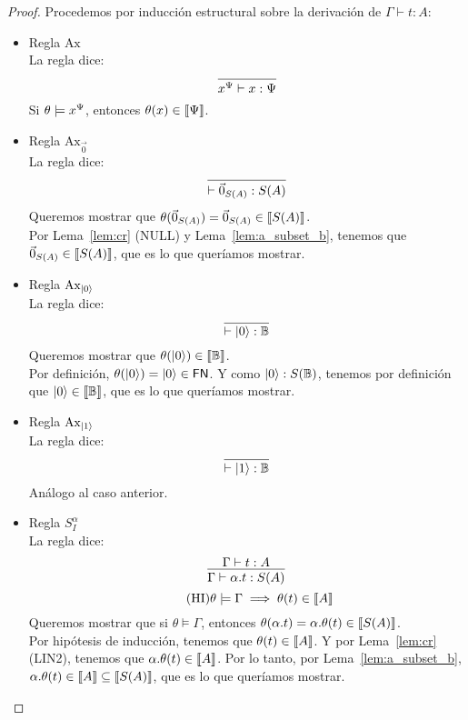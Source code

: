 \begin{proof}
  Procedemos por inducción estructural sobre la derivación de \( \Gamma \vdash t : A \):
  \begin{itemize}
    \item Regla \( \text{Ax} \)
    \\ La regla dice:
    \[ \infer{\vrbl{x}{\Psi} \vdash x : \Psi}{} \]
    Si \( \theta \models x^{\Psi} \), entonces \( \theta(x) \in \llbracket\Psi\rrbracket \).

    \item Regla \( \text{Ax}_{\vec{0}} \)
    \\ La regla dice:
    \[ \infer{\vdash \nullvec{A}: S(A)}{} \]
    Queremos mostrar que \( \theta(\vec{0}_{S (A)}) = \vec{0}_{S (A)} \in \llbracket S(A)\rrbracket \).
    \\ Por Lema~\ref{lem:cr} (NULL) y Lema~\ref{lem:a_subset_b}, tenemos que \( \vec{0}_{S (A)} \in \llbracket S(A)\rrbracket \), que es lo que queríamos mostrar.

    \item Regla \( \text{Ax}_{\ket{0}} \)
    \\ La regla dice:
    \[ \infer{\vdash \ket{0}: \qubittype}{} \]
    Queremos mostrar que \( \theta(\ket{0}) \in \llbracket\mathbb{B}\rrbracket \).
    \\ Por definición, \( \theta(\ket{0}) = \ket{0} \in \mathsf{FN} \). Y como \( \ket{0} : S(\mathbb{B}) \), tenemos por definición que \( \ket{0} \in \llbracket\mathbb{B}\rrbracket \), que es lo que queríamos mostrar.

    \item Regla \( \text{Ax}_{\ket{1}} \)
    \\ La regla dice:
    \[ \infer{\vdash \ket{1}: \qubittype}{} \]
    Análogo al caso anterior.

    \item Regla \( S^{\alpha}_{I} \)
    \\ La regla dice:
    \[ \infer{\Gamma \vdash \alpha . t : S(A)}{\Gamma \vdash t: A} \]
    \[
      \tag{HI}
      \theta \models \Gamma \implies \theta(t) \in \llbracket A\rrbracket
    \]
    Queremos mostrar que si \( \theta \models \Gamma \), entonces \( \theta(\alpha . t) = \alpha . \theta(t) \in \llbracket S(A)\rrbracket \).
    \\ Por hipótesis de inducción, tenemos que \( \theta(t) \in \llbracket A\rrbracket \). Y por Lema~\ref{lem:cr} (LIN2), tenemos que \( \alpha . \theta(t) \in \llbracket A\rrbracket \). Por lo tanto, por Lema~\ref{lem:a_subset_b}, \( \alpha . \theta(t) \in \llbracket A\rrbracket \subseteq \llbracket S(A)\rrbracket \), que es lo que queríamos mostrar.


\end{itemize}
\end{proof}
